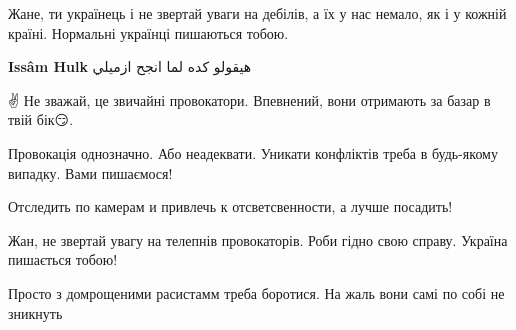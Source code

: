 \begin{itemize}
Жане, ти українець і не звертай уваги на дебілів, а їх у нас немало, як і у кожній країні. Нормальні українці пишаються тобою.

 
\textbf{Issâm Hulk} هيقولو كده لما انجح ازميلي

 
✌️ Не зважай, це звичайні провокатори. Впевнений, вони отримають за базар в твій бік😏.

 
Провокація однозначно. Або неадеквати. Уникати конфліктів треба в будь-якому випадку. Вами пишаємося!

 
Отследить по камерам и привлечь к отсветсвенности, а лучше посадить!

 
Жан, не звертай увагу на телепнів провокаторів. Роби гідно свою справу. Україна пишається тобою!

 
Просто з домрощеними расистамм треба боротися. На жаль вони самі по собі не зникнуть


\end{itemize}
